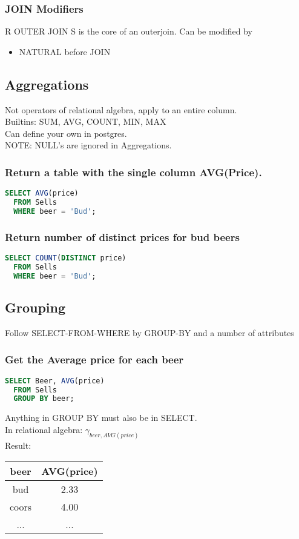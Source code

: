 \documentclass[12pt]{article}
\begin{document}
\subsubsection{JOIN Modifiers}
R OUTER JOIN S is the core of an outerjoin. Can be modified by
\begin{itemize}
    \item{NATURAL before JOIN}
\end{itemize}

\subsection{Aggregations}
Not operators of relational algebra, apply to an entire column.\\
Builtins: SUM, AVG, COUNT, MIN, MAX\\
Can define your own in postgres.\\
NOTE: NULL's are ignored in Aggregations.
\subsubsection{Return a table with the single column AVG(Price).}
\begin{lstlisting}[language=SQL]
  SELECT AVG(price)
  FROM Sells
  WHERE beer = 'Bud';
\end{lstlisting}

\subsubsection{Return number of distinct prices for bud beers}
\begin{lstlisting}[language=SQL]
  SELECT COUNT(DISTINCT price)
  FROM Sells
  WHERE beer = 'Bud';
\end{lstlisting}

\subsection{Grouping}
Follow SELECT-FROM-WHERE by GROUP-BY and a number of attributes

\subsubsection{Get the Average price for each beer}
\begin{lstlisting}[language=SQL]
  SELECT Beer, AVG(price)
  FROM Sells
  GROUP BY beer;
\end{lstlisting}
Anything in GROUP BY must also be in SELECT.\\
In relational algebra: 
$\gamma_{beer,AVG(price)}$\\
Result: 
\begin{tabular}{|c|c|}
  \hline
  beer & AVG(price)\\ 
  \hline
  bud & 2.33\\ 
  coors & 4.00\\ 
  ... & ...\\
\end{tabular}
\end{document}
